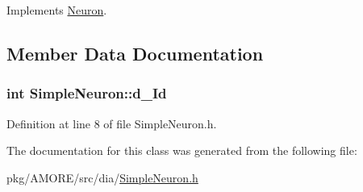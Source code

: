 Implements \hyperlink{class_neuron_a2953fb8e98aea1c74c4f796412644e11}{Neuron}.



\subsection{Member Data Documentation}
\hypertarget{class_simple_neuron_ad87b0b67c7f8bfe5377313c1e3fac60c}{
\subsubsection[{d\_\-Id}]{\setlength{\rightskip}{0pt plus 5cm}int {\bf SimpleNeuron::d\_\-Id}}}
\label{class_simple_neuron_ad87b0b67c7f8bfe5377313c1e3fac60c}


Definition at line 8 of file SimpleNeuron.h.



The documentation for this class was generated from the following file:\begin{DoxyCompactItemize}
\item 
pkg/AMORE/src/dia/\hyperlink{_simple_neuron_8h}{SimpleNeuron.h}\end{DoxyCompactItemize}

